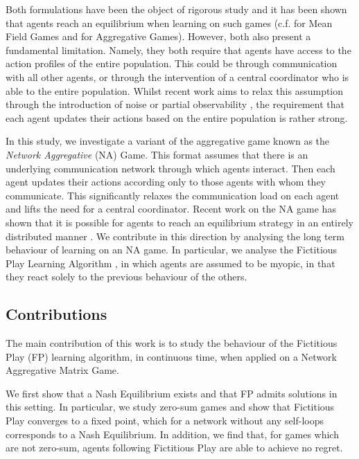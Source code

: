 \documentclass{article}
\theoremstyle{definition}
\begin{document}
Both formulations have been the object of rigorous study and it has been shown that agents reach an equilibrium when learning on such games (c.f. \cite{MFGLearningPapers} for Mean Field Games and
\cite{Aggregative Papers} for Aggregative Games). However, both also present a fundamental limitation.
Namely, they both require that agents have access to the action profiles of the entire population.
This could be through communication with all other agents, or through the intervention of a central
coordinator who is able to the entire population. Whilst recent work aims to relax this assumption
through the introduction of noise \cite{MFG-FP} or partial observability \cite{AAMASPaper}, the
requirement that each agent updates their actions based on the entire population is rather strong.

In this study, we investigate a variant of the aggregative game known as the \emph{Network
Aggregative} (NA) Game. This format assumes that there is an underlying communication network
through which agents interact. Then each agent updates their actions according only to those agents
with whom they communicate. This significantly relaxes the communication load on each agent and
lifts the need for a central coordinator. Recent work on the NA game has shown that it is possible
for agents to reach an equilibrium strategy in an entirely distributed manner \cite{Grammatico,
LeaderFollower, MyopicAgents}. We contribute in this direction by analysing the long term behaviour of learning on an NA game. In particular, we analyse the Fictitious Play Learning
Algorithm \cite{Brown, Harris}, in which agents are assumed to be myopic, in that they react solely
to the previous behaviour of the others.


\subsection{Contributions}

  The main contribution of this work is to study the behaviour of the Fictitious Play (FP) learning
  algorithm, in continuous time, when applied on a Network Aggregative Matrix Game.


  We first show that a Nash Equilibrium exists and that FP admits
  solutions in this setting. In particular, we study zero-sum games and show that
  Fictitious Play converges to a fixed point, which for a network without any
  self-loops corresponds to a Nash Equilibrium. In addition, we find that, for games
  which are not zero-sum, agents following Fictitious Play are able to
  achieve no regret.
\end{document}
